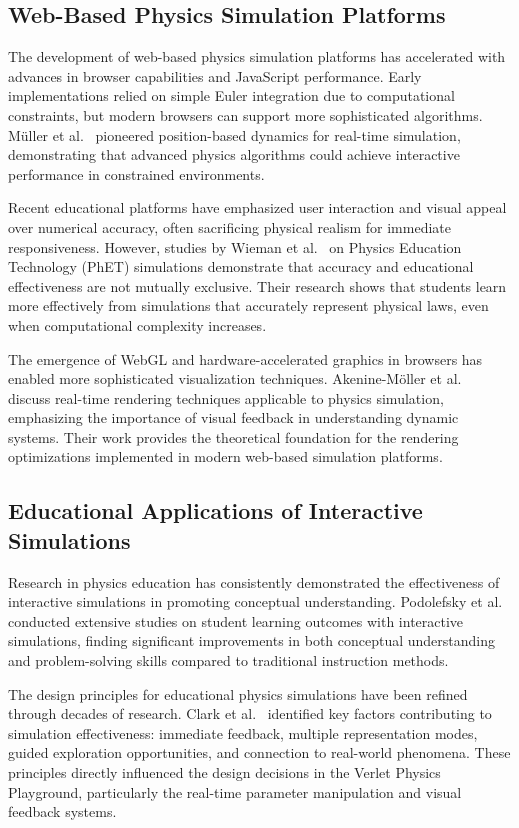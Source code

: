 \documentclass[12pt,journal,onecolumn]{IEEEtran}
\begin{document}
\subsection{Web-Based Physics Simulation Platforms}
The development of web-based physics simulation platforms has accelerated with advances in browser capabilities and JavaScript performance. Early implementations relied on simple Euler integration due to computational constraints, but modern browsers can support more sophisticated algorithms. Müller et al.~\cite{muller2007} pioneered position-based dynamics for real-time simulation, demonstrating that advanced physics algorithms could achieve interactive performance in constrained environments.

Recent educational platforms have emphasized user interaction and visual appeal over numerical accuracy, often sacrificing physical realism for immediate responsiveness. However, studies by Wieman et al.~\cite{wieman2008} on Physics Education Technology (PhET) simulations demonstrate that accuracy and educational effectiveness are not mutually exclusive. Their research shows that students learn more effectively from simulations that accurately represent physical laws, even when computational complexity increases.

The emergence of WebGL and hardware-accelerated graphics in browsers has enabled more sophisticated visualization techniques. Akenine-Möller et al.~\cite{akenine2018} discuss real-time rendering techniques applicable to physics simulation, emphasizing the importance of visual feedback in understanding dynamic systems. Their work provides the theoretical foundation for the rendering optimizations implemented in modern web-based simulation platforms.

\subsection{Educational Applications of Interactive Simulations}
Research in physics education has consistently demonstrated the effectiveness of interactive simulations in promoting conceptual understanding. Podolefsky et al.~\cite{podolefsky2010} conducted extensive studies on student learning outcomes with interactive simulations, finding significant improvements in both conceptual understanding and problem-solving skills compared to traditional instruction methods.

The design principles for educational physics simulations have been refined through decades of research. Clark et al.~\cite{clark2016} identified key factors contributing to simulation effectiveness: immediate feedback, multiple representation modes, guided exploration opportunities, and connection to real-world phenomena. These principles directly influenced the design decisions in the Verlet Physics Playground, particularly the real-time parameter manipulation and visual feedback systems.
\end{document}
